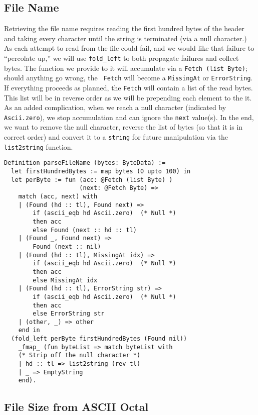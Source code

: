 \documentclass[nocopyrightspace,preprint]{sigplanconf}
\begin{document}
\subsection{File Name}

Retrieving the file name requires reading the first hundred bytes of the
header and taking every character until the string is terminated (via a null
character.) As each attempt to read from the file could fail, and we would
like that failure to ``percolate up,'' we will use {\tt fold\_left} to both
propagate failures and collect bytes. The function we provide to it will
accumulate via a {\tt Fetch (list Byte)}; should anything go wrong, the {\tt
Fetch} will become a {\tt MissingAt} or {\tt ErrorString}. If everything
proceeds as planned, the {\tt Fetch} will contain a list of the read bytes.
This list will be in reverse order as we will be prepending each element to
the it. As an added complication, when we reach a null character (indicated by
{\tt Ascii.zero}), we stop accumulation and can ignore the {\tt next}
value(s).  In the end, we want to remove the null character, reverse the list
of bytes (so that it is in correct order) and convert it to a {\tt string} for
future manipulation via the {\tt list2string} function.

\begin{lstlisting}
Definition parseFileName (bytes: ByteData) :=
  let firstHundredBytes := map bytes (0 upto 100) in
  let perByte := fun (acc: @Fetch (list Byte) )
                     (next: @Fetch Byte) =>
    match (acc, next) with
    | (Found (hd :: tl), Found next) =>
        if (ascii_eqb hd Ascii.zero)  (* Null *)
        then acc
        else Found (next :: hd :: tl)
    | (Found _, Found next) =>
        Found (next :: nil)
    | (Found (hd :: tl), MissingAt idx) =>
        if (ascii_eqb hd Ascii.zero)  (* Null *)
        then acc
        else MissingAt idx
    | (Found (hd :: tl), ErrorString str) =>
        if (ascii_eqb hd Ascii.zero)  (* Null *)
        then acc
        else ErrorString str
    | (other, _) => other
    end in
  (fold_left perByte firstHundredBytes (Found nil)) 
    _fmap_ (fun byteList => match byteList with
    (* Strip off the null character *)
    | hd :: tl => list2string (rev tl)
    | _ => EmptyString
    end).
\end{lstlisting}


\subsection{File Size from ASCII Octal}
\end{document}
